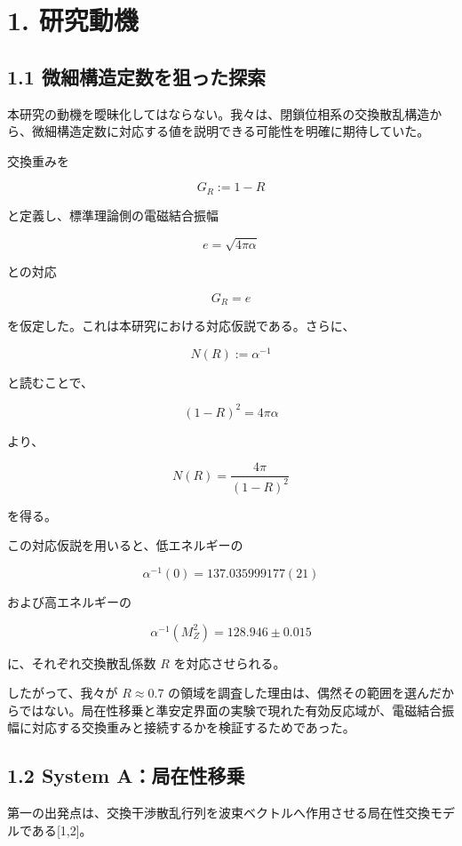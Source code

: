 \documentclass[
  10pt,
  a4paper,
]{article}
\begin{document}
\section{1. 研究動機}\label{ux7814ux7a76ux52d5ux6a5f}

\subsection{1.1
微細構造定数を狙った探索}\label{ux5faeux7d30ux69cbux9020ux5b9aux6570ux3092ux72d9ux3063ux305fux63a2ux7d22}

本研究の動機を曖昧化してはならない。我々は、閉鎖位相系の交換散乱構造から、微細構造定数に対応する値を説明できる可能性を明確に期待していた。

交換重みを

\[
G_R:=1-R
\]

と定義し、標準理論側の電磁結合振幅

\[
e=\sqrt{4\pi\alpha}
\]

との対応

\[
G_R=e
\]

を仮定した。これは本研究における対応仮説である。さらに、

\[
N(R):=\alpha^{-1}
\]

と読むことで、

\[
(1-R)^2=4\pi\alpha
\]

より、

\[
\boxed{
N(R)=\frac{4\pi}{(1-R)^2}
}
\]

を得る。

この対応仮説を用いると、低エネルギーの

\[
\alpha^{-1}(0)=137.035999177(21)
\]

および高エネルギーの

\[
\alpha^{-1}(M_Z^2)=128.946\pm0.015
\]

に、それぞれ交換散乱係数 \(R\) を対応させられる。

したがって、我々が \(R\approx0.7\)
の領域を調査した理由は、偶然その範囲を選んだからではない。局在性移乗と準安定界面の実験で現れた有効反応域が、電磁結合振幅に対応する交換重みと接続するかを検証するためであった。

\subsection{1.2 System
A：局在性移乗}\label{system-aux5c40ux5728ux6027ux79fbux4e57}

第一の出発点は、交換干渉散乱行列を波束ベクトルへ作用させる局在性交換モデルである{[}1,2{]}。
\end{document}
